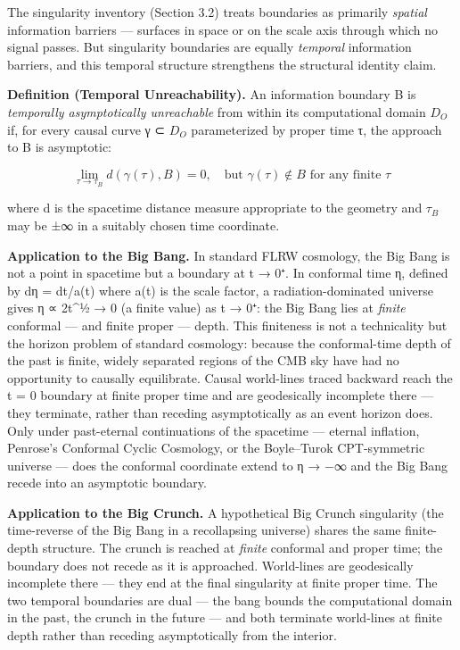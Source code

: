 \documentclass[
]{article}
\begin{document}
The singularity inventory (Section 3.2) treats boundaries as primarily
\emph{spatial} information barriers --- surfaces in space or on the
scale axis through which no signal passes. But singularity boundaries
are equally \emph{temporal} information barriers, and this temporal
structure strengthens the structural identity claim.

\textbf{Definition (Temporal Unreachability).} An information boundary B
is \emph{temporally asymptotically unreachable} from within its
computational domain \(D_O\) if, for every causal curve γ ⊂ \(D_O\)
parameterized by proper time τ, the approach to B is asymptotic:

\[\lim_{\tau \to \tau_B} d(\gamma(\tau), B) = 0, \quad \text{but } \gamma(\tau) \notin B \text{ for any finite } \tau\]

where d is the spacetime distance measure appropriate to the geometry
and \(\tau_{B}\) may be ±∞ in a suitably chosen time coordinate.

\textbf{Application to the Big Bang.} In standard FLRW cosmology, the
Big Bang is not a point in spacetime but a boundary at t → 0⁺. In
conformal time η, defined by dη = dt/a(t) where a(t) is the scale
factor, a radiation-dominated universe gives η ∝ 2t\^{}½ → 0 (a finite
value) as t → 0⁺: the Big Bang lies at \emph{finite} conformal --- and
finite proper --- depth. This finiteness is not a technicality but the
horizon problem of standard cosmology: because the conformal-time depth
of the past is finite, widely separated regions of the CMB sky have had
no opportunity to causally equilibrate. Causal world-lines traced
backward reach the t = 0 boundary at finite proper time and are
geodesically incomplete there --- they terminate, rather than receding
asymptotically as an event horizon does. Only under past-eternal
continuations of the spacetime --- eternal inflation, Penrose's
Conformal Cyclic Cosmology, or the Boyle--Turok CPT-symmetric universe
--- does the conformal coordinate extend to η → −∞ and the Big Bang
recede into an asymptotic boundary.

\textbf{Application to the Big Crunch.} A hypothetical Big Crunch
singularity (the time-reverse of the Big Bang in a recollapsing
universe) shares the same finite-depth structure. The crunch is reached
at \emph{finite} conformal and proper time; the boundary does not recede
as it is approached. World-lines are geodesically incomplete there ---
they end at the final singularity at finite proper time. The two
temporal boundaries are dual --- the bang bounds the computational
domain in the past, the crunch in the future --- and both terminate
world-lines at finite depth rather than receding asymptotically from the
interior.
\end{document}
